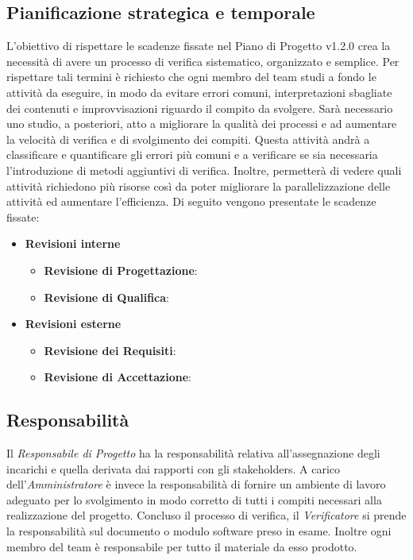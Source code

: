 \subsection{Pianificazione strategica e temporale}
L’obiettivo di rispettare le scadenze fissate nel Piano di Progetto v1.2.0 crea la necessità di avere un processo di verifica sistematico, organizzato e semplice. Per rispettare tali termini è richiesto che ogni membro del team studi a fondo le attività da eseguire, in modo da evitare errori comuni, interpretazioni sbagliate dei contenuti e improvvisazioni riguardo il compito da svolgere. Sarà necessario uno studio, a posteriori, atto a migliorare la qualità dei processi e ad aumentare la velocità di verifica e di svolgimento dei compiti. Questa attività andrà a classificare e quantificare gli errori più comuni e a verificare se sia necessaria l’introduzione di metodi aggiuntivi di verifica. Inoltre, permetterà di vedere quali attività richiedono più risorse così da poter migliorare la parallelizzazione delle attività ed aumentare l’efficienza. Di seguito vengono presentate le scadenze fissate:
\begin{itemize}
\item \textbf{Revisioni interne}
\begin{itemize}
\item[\-] \textbf{Revisione di Progettazione}: %
\item[\-] \textbf{Revisione di Qualifica}: %
\end{itemize}
\item \textbf{Revisioni esterne}
\begin{itemize}
\item[\-] \textbf{Revisione dei Requisiti}: %
\item[\-] \textbf{Revisione di Accettazione}: %
\end{itemize}
\end{itemize}


\subsection{Responsabilità}
Il \textit{Responsabile di Progetto} ha la responsabilità relativa all’assegnazione degli incarichi e quella derivata dai rapporti con gli stakeholders. A carico dell’\textit{Amministratore} è invece la responsabilità di fornire un ambiente di lavoro adeguato per lo svolgimento in modo corretto di tutti i compiti necessari alla realizzazione del progetto. Concluso il processo di verifica, il \textit{Verificatore} si prende la responsabilità sul documento o modulo software preso in esame. Inoltre ogni membro del team è responsabile per tutto il materiale da esso prodotto.


